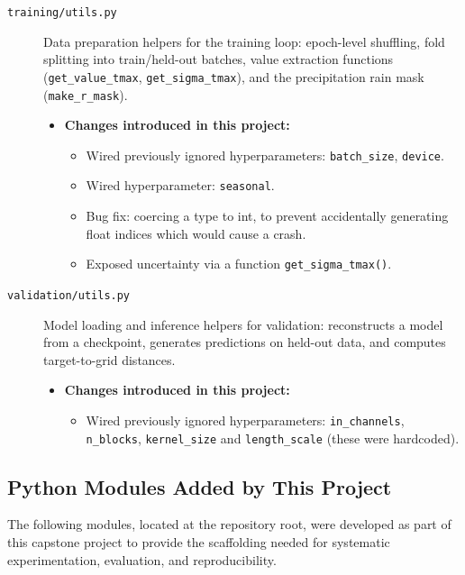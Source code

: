 \begin{description}
\item[\texttt{training/utils.py}] Data preparation helpers for the training loop: epoch-level shuffling, fold splitting into train/held-out batches, value extraction functions (\texttt{get\_value\_tmax}, \texttt{get\_sigma\_tmax}), and the precipitation rain mask (\texttt{make\_r\_mask}).
  \begin{itemize}
      \item[] \textbf{Changes introduced in this project:}
      \begin{itemize}
            \item Wired previously ignored hyperparameters: \texttt{batch\_size}, \texttt{device}.
            \item Wired hyperparameter: \texttt{seasonal}.
            \item Bug fix: coercing a type to int, to prevent accidentally generating float indices which would cause a crash.
            \item Exposed uncertainty via a function \texttt{get\_sigma\_tmax()}.
      \end{itemize}
  \end{itemize} 

\item[\texttt{validation/utils.py}] Model loading and inference helpers for validation: reconstructs a model from a checkpoint, generates predictions on held-out data, and computes target-to-grid distances.
  \begin{itemize}
      \item[] \textbf{Changes introduced in this project:}
      \begin{itemize}
            \item Wired previously ignored hyperparameters: \texttt{in\_channels}, \texttt{n\_blocks}, \texttt{kernel\_size} and \texttt{length\_scale} (these were hardcoded).
      \end{itemize}
  \end{itemize} 

\end{description}

\subsection{Python Modules Added by This Project}

The following modules, located at the repository root, were developed as part of this capstone project to provide the scaffolding needed for systematic experimentation, evaluation, and reproducibility.

